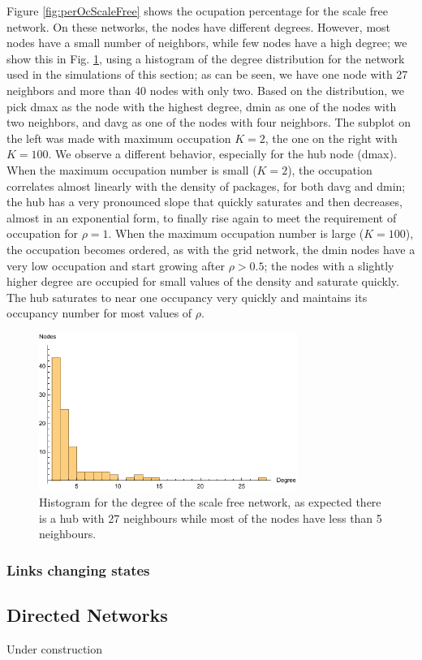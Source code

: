 \documentclass[12pt]{article}
\begin{document}
Figure \ref{fig:perOcScaleFree} shows the ocupation percentage for the scale free network. 
On these networks, the nodes have different degrees. 
However, most nodes have a small number of neighbors, while few nodes have a high degree; we show this in Fig. \ref{fig:degreeDistSF}, using a histogram of the degree distribution for the network used in the simulations of this section; as can be seen, we have one node with 27 neighbors and more than 40 nodes with only two.
Based on the distribution, we pick dmax as the node with the highest degree, dmin as one of the nodes with two neighbors, and davg as one of the nodes with four neighbors.
The subplot on the left was made with maximum occupation $K=2$, the one on the right with $K=100$.
We observe a different behavior, especially for the hub node (dmax).
When the maximum occupation number is small ($K=2$), the occupation correlates almost linearly with the density of packages, for both davg and dmin; the hub has a very pronounced slope that quickly saturates and then decreases, almost in an exponential form, to finally rise again to meet the requirement of occupation for $\rho =1$.
When the maximum occupation number is large ($K=100$), the occupation becomes ordered, as with the grid network, the dmin nodes have a very low occupation and start growing after $\rho > 0.5$; the nodes with a slightly higher degree are occupied for small values of the density and saturate quickly.
The hub saturates to near one occupancy very quickly and maintains its occupancy number for most values of $\rho$.

\begin{figure}[!hbt]
  \centering
  \includegraphics[width=0.75\textwidth]{plots/degDistributionScaleFree.pdf}
  \caption{Histogram for the degree of the scale free network, as expected there is a hub with 27 neighbours while most of the nodes have less than 5 neighbours.}
  \label{fig:degreeDistSF}
\end{figure}


\subsubsection{Links changing states}
\label{sec:undirected-red-green}


	
\subsection{Directed Networks}
\label{sec:directed}

Under construction
\end{document}
